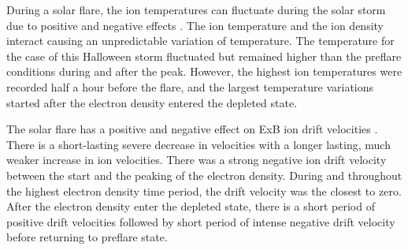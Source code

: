 During a solar flare, the ion temperatures can fluctuate during the solar storm due to positive and negative effects \cite{ITemp}. The ion temperature and the ion density interact causing an unpredictable variation of temperature. The temperature for the case of this Halloween storm fluctuated but remained higher than the preflare conditions during and after the peak. However, the highest ion temperatures were recorded half a hour before the flare, and the largest temperature variations started after the electron density entered the depleted state.  

The solar flare has a positive and negative effect on ExB ion drift velocities \cite{IDrift}. There is a short-lasting severe decrease in velocities with a longer lasting, much weaker increase in ion velocities. There was a strong negative ion drift velocity between the start and the peaking of the electron density. During and throughout the highest electron density time period, the drift velocity was the closest to zero. After the electron density enter the depleted state, there is a short period of positive drift velocities followed by short period of intense negative drift velocity before returning to preflare state.


